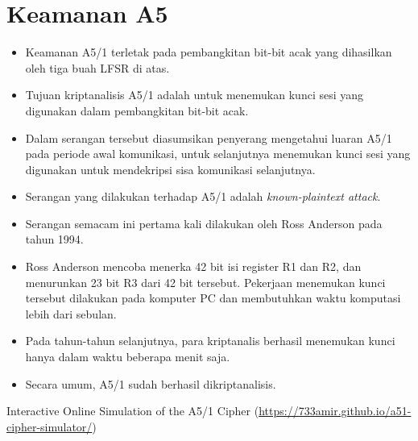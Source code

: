 \documentclass{article}
\begin{document}
\newpage


\section*{Keamanan A5}

\begin{itemize}
    \item Keamanan A5/1 terletak pada pembangkitan bit-bit acak yang dihasilkan oleh tiga buah LFSR di atas.
    \item Tujuan kriptanalisis A5/1 adalah untuk menemukan kunci sesi yang digunakan dalam pembangkitan bit-bit acak.
    \item Dalam serangan tersebut diasumsikan penyerang mengetahui luaran A5/1 pada periode awal komunikasi, untuk selanjutnya menemukan kunci sesi yang digunakan untuk mendekripsi sisa komunikasi selanjutnya.
\end{itemize}

\newpage


\begin{itemize}
  \item Serangan yang dilakukan terhadap A5/1 adalah \textit{known-plaintext attack}.
  \item Serangan semacam ini pertama kali dilakukan oleh Ross Anderson pada tahun 1994.
  \item Ross Anderson mencoba menerka 42 bit isi register R1 dan R2, dan menurunkan 23 bit R3 dari 42 bit tersebut. Pekerjaan menemukan kunci tersebut dilakukan pada komputer PC dan membutuhkan waktu komputasi lebih dari sebulan.
  \item Pada tahun-tahun selanjutnya, para kriptanalis berhasil menemukan kunci hanya dalam waktu beberapa menit saja.
  \item Secara umum, A5/1 sudah berhasil dikriptanalisis.
\end{itemize}

\newpage


\vspace{246.51mm}

Interactive Online Simulation of the A5/1 Cipher (\href{https://733amir.github.io/a51-cipher-simulator/}{https://733amir.github.io/a51-cipher-simulator/})

\vspace{10mm}
\end{document}
